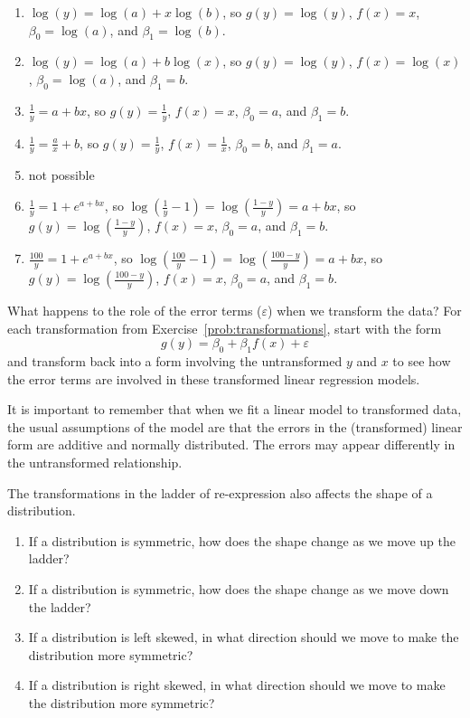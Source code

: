 \documentclass[twoside]{book}\usepackage[]{graphicx}\usepackage[]{xcolor}
\def\myindex#1{\index{#1}}
\begin{document}
\begin{solution}
  \begin{enumerate}
  \item
	$\log(y) = \log(a) + x \log(b)$, 
	so $g(y) = \log(y)$,
	$f(x) = x$, 
	$\beta_0=\log(a)$,
	and $\beta_1=\log(b)$.
  \item
	$\log(y) = \log(a) + b \log(x)$, 
	so $g(y) = \log(y)$,
	$f(x) = \log(x)$, 
	$\beta_0=\log(a)$,
	and $\beta_1=b$.
  \item
	$\frac{1}{y} = a + b x$, 
	so $g(y) = \frac{1}{y}$,
	$f(x) = x$, 
	$\beta_0=a$,
	and $\beta_1=b$.
  \item
	$\frac{1}{y} = \frac{a}{x} + b$, 
	so $g(y) = \frac{1}{y}$,
	$f(x) = \frac{1}{x}$, 
	$\beta_0=b$,
	and $\beta_1=a$.
   \item
	not possible
  \item
	$\frac{1}{y} = 1 + e^{a + bx}$, so
	$\log(\frac{1}{y} - 1) = \log( \frac{1-y}{y} ) = {a + bx}$, 
	so $g(y) = \log(\frac{1-y}{y})$,
	$f(x) = {x}$, 
	$\beta_0=a$,
	and $\beta_1=b$.
  \item
	$\frac{100}{y} = 1 + e^{a + bx}$, so
	$\log(\frac{100}{y} - 1) = \log( \frac{100-y}{y} ) = {a + bx}$, 
	so $g(y) = \log(\frac{100-y}{y})$,
	$f(x) = {x}$, 
	$\beta_0=a$,
	and $\beta_1=b$.
  \end{enumerate}
\end{solution}

\begin{problem}
  What happens to the role of the error terms ($\varepsilon$) when we transform 
  the data?  For each transformation from Exercise~\ref{prob:transformations},
  start with the form
  \[
  g(y) = \beta_0 + \beta_1 f(x) + \varepsilon
  \]
  and transform back into a form involving the untransformed $y$ and $x$ to
  see how the error terms are involved in these transformed linear regression
  models.

  It is important to remember that when we fit a linear model to transformed
  data, the usual assumptions of the model are that the errors in the (transformed) 
  linear form are additive and normally distributed.  The errors may appear
  differently in the untransformed relationship.
\end{problem}

\begin{problem}
\myindex{Tukey bulge|probidx}%
\label{prob:TukeyBulgeSkew}%
The transformations in the ladder of re-expression also affects the shape
of a distribution.  
\begin{enumerate}
\item
If a distribution is symmetric, how does the shape change as we 
move up the ladder?
\item
If a distribution is symmetric, how does the shape change as we 
move down the ladder?
\item
If a distribution is left skewed, in what direction should we move to 
make the distribution more symmetric?
\item
If a distribution is right skewed, in what direction should we move to 
make the distribution more symmetric?
\end{enumerate}
\end{problem}
\end{document}
